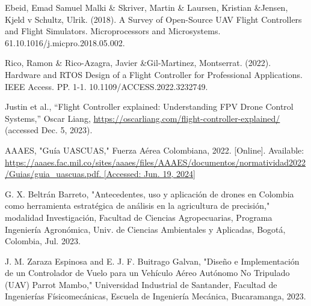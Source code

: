\documentclass[journal,onecolumn]{IEEEtran}
\begin{document}
\clearpage







\begin{thebibliography}{20}

Ebeid, Emad Samuel Malki \& Skriver, Martin \& Laursen, Kristian \&Jensen, Kjeld v Schultz, Ulrik. (2018). A Survey of Open-Source UAV Flight Controllers and Flight Simulators. Microprocessors and Microsystems. 61.10.1016/j.micpro.2018.05.002. 

Rico, Ramon \& Rico-Azagra, Javier \&Gil-Martinez, Montserrat. (2022). Hardware and RTOS Design of a Flight Controller for Professional Applications. IEEE Access. PP. 1-1. 10.1109/ACCESS.2022.3232749. 

 Justin et al., “Flight Controller explained: Understanding FPV Drone Control Systems,” Oscar Liang, \url{https://oscarliang.com/flight-controller-explained/} (accessed Dec. 5, 2023). 

AAAES, "Guía UASCUAS," Fuerza Aérea Colombiana, 2022. [Online]. Available: \url{https://aaaes.fac.mil.co/sites/aaaes/files/AAAES/documentos/normatividad2022/Guias/guia_uascuas.pdf. [Accessed: Jun. 19, 2024]}

 G. X. Beltrán Barreto, "Antecedentes, uso y aplicación de drones en Colombia como herramienta estratégica de análisis en la agricultura de precisión," modalidad Investigación, Facultad de Ciencias Agropecuarias, Programa Ingeniería Agronómica, Univ. de Ciencias Ambientales y Aplicadas, Bogotá, Colombia, Jul. 2023.



 J. M. Zaraza Espinosa and E. J. F. Buitrago Galvan, "Diseño e Implementación de un Controlador de Vuelo para un Vehículo Aéreo Autónomo No Tripulado (UAV) Parrot Mambo," Universidad Industrial de Santander, Facultad de Ingenierías Físicomecánicas, Escuela de Ingeniería Mecánica, Bucaramanga, 2023.


\end{thebibliography}
\end{document}

